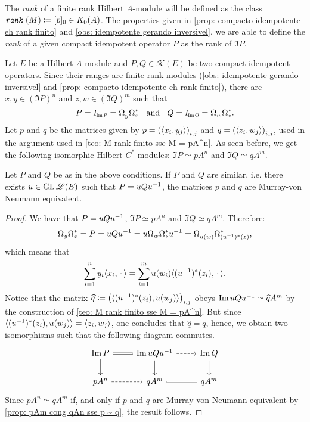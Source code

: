 \begin{definicao}
The \textit{rank} of a finite rank Hilbert $A$-module will be defined as the class $\texttt{\textit{rank}}\,(M) \coloneqq [p]_0 \in K_0(A)$. The properties given in \ref{prop: compacto idempotente eh rank finito} and \ref{obs: idempotente gerando inversivel}, we are able to define the \textit{rank} of a given compact idempotent operator $P$ as the rank of $\Im P$.
\end{definicao}

Let $E$ be a Hilbert $A$-module and $P, Q \in \mathscr K(E)$ be two compact idempotent operators. Since their ranges are finite-rank modules (\ref{obs: idempotente gerando inversivel} and \ref{prop: compacto idempotente eh rank finito}), there are $x,y \in (\Im P)^n$ and $z,w \in (\Im Q)^m$ such that 
$$P = \sub\Id{\Im P} = \Omega_{y}^{\,}\Omega_x^* \e Q = \sub\Id{\Im Q} = \Omega_{w}^{\,}\Omega_z^*.$$ 
Let $p$ and $q$ be the matrices given by $p=\left(\langle {x_i},{y_j}\rangle\right)_{i,j}$ and $q=\left(\langle {z_i},{w_j}\rangle\right)_{i,j}$, used in the argument used in \ref{teo: M rank finito sse M = pA^n}. As seen before, we get the following isomorphic Hilbert $C^*$-modules: $\Im P \simeq pA^n$ and $\Im Q \simeq q A^m$. 


\begin{lema}\label{lema: [P]_0 = [Q]_0 ---> [p]_0 = [q]_0}
    Let $P$ and $Q$ be as in the above conditions. If $P$ and $Q$ are similar, i.e. there exists $u \in \operatorname{GL} \mathscr L(E)$ such that $P = uQ{u}^{-1}$, the matrices $p$ and $q$ are Murray-von Neumann equivalent. 
    \begin{proof}
    We have that $P = uQ{u}^{-1}$, $\Im P \simeq pA^n$ and $\Im Q \simeq qA^m$. Therefore:
    $$
    \Omega_y\Omega_x^* = P = uQ{u}^{-1} = u\Omega_{w}\Omega_z^*{u}^{-1} = \Omega_{u(w)}^{\,}\Omega_{({{u}^{-1}})^*(z)}^*, $$
        which means that
        $$\sum_{i=1}^n y_i \langle {x_i},{\operatorname{\,\cdot\,}}\rangle = \sum_{i=1}^m u(w_i)\langle {({u}^{-1})^*(z_i)},{\operatorname{\,\cdot\,}}\rangle.$$ 
        Notice that the matrix $\widehat q \coloneqq \left(\langle {({u}^{-1})^*(z_i)},{u(w_j)}\rangle\right)_{i,j}$ obeys $\operatorname{Im} uQ{u}^{-1} \simeq \widehat{q}A^m$ by the construction of \ref{teo: M rank finito sse M = pA^n}. But since $\langle {({u}^{-1})^*(z_i)},{u(w_j)}\rangle = \langle {z_i},{w_j}\rangle$, one concludes that $\widehat{q} = q$, hence, we obtain two isomorphisms such that the following diagram commutes.
        \begin{equation*}
\begin{tikzcd}
    \Im P \arrow[d]        & \Im uQu^{-1} \arrow[l, no head, equal] \arrow[d] \arrow[r, dashed] & \Im Q \arrow[d] \\
    pA^n \arrow[r, dashed] & qA^m \arrow[r, no head, equal]                                     & qA^m           
    \end{tikzcd}
        \end{equation*}
        Since $pA^n\simeq qA^m$ if, and only if $p$ and $q$ are Murray-von Neumann equivalent by \ref{prop: pAm cong qAn sse p ~ q}, the result follows. 
    \end{proof}   
\end{lema}

